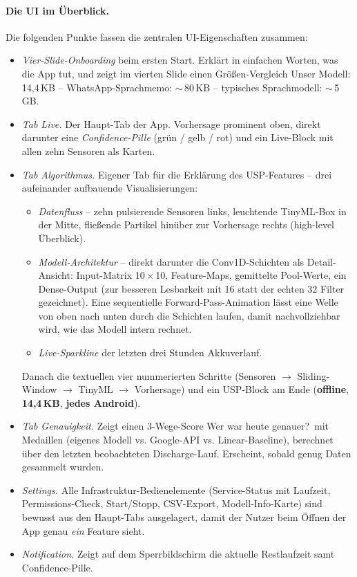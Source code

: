 \documentclass[12pt, a4paper, ngerman]{article}
\begin{document}
\newpage

\paragraph{Die UI im Überblick.}
Die folgenden Punkte fassen die zentralen UI-Eigenschaften zusammen:

\begin{itemize}
\item \emph{Vier-Slide-Onboarding} beim ersten Start. Erklärt in
  einfachen Worten, was die App tut, und zeigt im vierten Slide
  einen Größen-Vergleich \glqq{}Unser Modell: 14,4\,KB --
  WhatsApp-Sprachmemo: $\sim$\,80\,KB -- typisches Sprachmodell:
  $\sim$\,5\,GB\grqq{}.
\item \emph{Tab \glqq{}Live\grqq{}.} Der Haupt-Tab der App.
  Vorhersage prominent oben, direkt darunter eine
  \emph{Confidence-Pille} (grün / gelb / rot) und ein Live-Block
  mit allen zehn Sensoren als Karten.
\item \emph{Tab \glqq{}Algorithmus\grqq{}.} Eigener Tab für die
  Erklärung des USP-Features -- drei aufeinander aufbauende
  Visualisierungen:
  \begin{itemize}
  \item \emph{Datenfluss} -- zehn pulsierende Sensoren links,
    leuchtende TinyML-Box in der Mitte, fließende Partikel
    hinüber zur Vorhersage rechts (high-level Überblick).
  \item \emph{Modell-Architektur} -- direkt darunter die
    Conv1D-Schichten als Detail-Ansicht: Input-Matrix
    10\,$\times$\,10, Feature-Maps, gemittelte Pool-Werte,
    ein Dense-Output (zur besseren Lesbarkeit mit 16 statt der
    echten 32 Filter gezeichnet). Eine sequentielle Forward-Pass-Animation
    lässt eine \glqq{}Welle\grqq{} von oben nach unten durch die
    Schichten laufen, damit nachvollziehbar wird, wie das Modell
    intern rechnet.
  \item \emph{Live-Sparkline} der letzten drei Stunden Akkuverlauf.
  \end{itemize}
  Danach die textuellen vier nummerierten Schritte
  (Sensoren $\to$ Sliding-Window $\to$ TinyML $\to$ Vorhersage)
  und ein USP-Block am Ende (\textbf{offline}, \textbf{14,4\,KB},
  \textbf{jedes Android}).
\item \emph{Tab \glqq{}Genauigkeit\grqq{}.} Zeigt einen
  3-Wege-Score \glqq{}Wer war heute genauer?\grqq{}\ mit Medaillen
  (eigenes Modell vs. Google-API vs. Linear-Baseline), berechnet
  über den letzten beobachteten Discharge-Lauf. Erscheint, sobald
  genug Daten gesammelt wurden.
\item \emph{Settings.} Alle
  Infrastruktur-Bedienelemente (Service-Status mit Laufzeit, Permissions-Check,
  Start/Stopp, CSV-Export, Modell-Info-Karte) sind bewusst aus
  den Haupt-Tabs ausgelagert, damit der Nutzer beim Öffnen der
  App genau \emph{ein} Feature sieht.
\item \emph{Notification.} Zeigt auf dem Sperrbildschirm die
  aktuelle Restlaufzeit samt Confidence-Pille.
\end{itemize}
\end{document}
